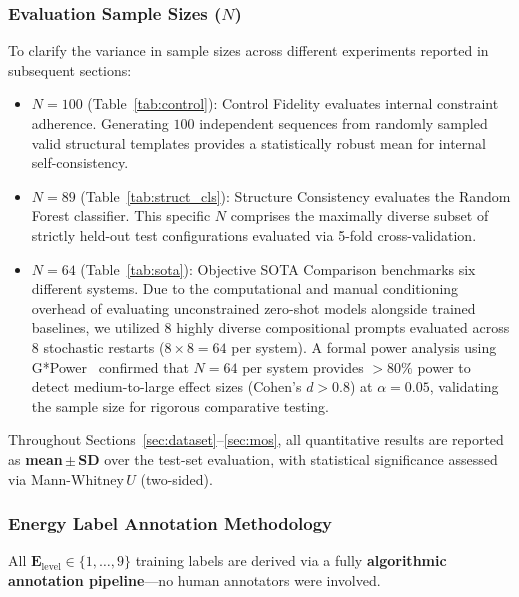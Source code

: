 \documentclass[conference]{IEEEtran}
\begin{document}
\subsubsection*{Evaluation Sample Sizes ($N$)}
To clarify the variance in sample sizes across different experiments reported in subsequent sections:
\begin{itemize}[nosep,leftmargin=*]
  \item \textbf{$N=100$} (Table~\ref{tab:control}): Control Fidelity evaluates internal constraint adherence. Generating $100$ independent sequences from randomly sampled valid structural templates provides a statistically robust mean for internal self-consistency.
  \item \textbf{$N=89$} (Table~\ref{tab:struct_cls}): Structure Consistency evaluates the Random Forest classifier. This specific $N$ comprises the maximally diverse subset of strictly held-out test configurations evaluated via 5-fold cross-validation.
  \item \textbf{$N=64$} (Table~\ref{tab:sota}): Objective SOTA Comparison benchmarks six different systems. Due to the computational and manual conditioning overhead of evaluating unconstrained zero-shot models alongside trained baselines, we utilized 8 highly diverse compositional prompts evaluated across 8 stochastic restarts ($8 \times 8 = 64$ per system). A formal power analysis using G*Power~\cite{faul2007gpower} confirmed that $N=64$ per system provides $>80\%$ power to detect medium-to-large effect sizes (Cohen's $d>0.8$) at $\alpha=0.05$, validating the sample size for rigorous comparative testing.
\end{itemize}

Throughout Sections~\ref{sec:dataset}--\ref{sec:mos}, all quantitative
results are reported as \textbf{mean\,$\pm$\,SD} over the
test-set evaluation, with statistical significance assessed via
Mann-Whitney\,$U$ (two-sided).

\subsubsection*{Energy Label Annotation Methodology}
\label{sec:energy_annotation}
All $\mathbf{E}_{\mathrm{level}} \in \{1,\ldots,9\}$ training labels are derived via a fully \textbf{algorithmic annotation pipeline}---no human annotators were involved.
\end{document}
